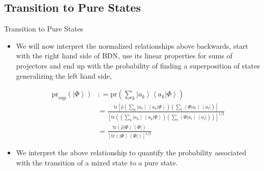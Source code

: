 \documentclass[9pt,handout]{beamer}
\newcommand{\pr}[0]{\text{pr}}
\newcommand{\tr}[0]{\text{tr}}
\begin{document}
\subsection{Transition to Pure States}
\begin{frame}{Transition to Pure States}
\begin{itemize}
\item We will now interpret the normalized relationships above backwards, start with the right hand side of BDN, use its linear properties for sums of projectors and end up with the probability of finding a superposition of states generalizing the left hand side,

\begin{align*}
\pr_{\text{sup}} \left( \left\lvert \Phi \right\rangle \right) & : = \pr \left( \sum_k \left\lvert a_k \right\rangle \left\langle a_k \right\rvert \left. \Phi \right\rangle \right) \\
& = \frac{\tr \left[ \widehat{\rho} \left( \sum_k \left\lvert a_k \right\rangle \left\langle a_k \right\rvert \left. \Phi \right\rangle \right) \left( \sum_l \left\langle \Phi \right\rvert \left. a_l \right\rangle \left\langle a_l \right\rvert \right) \right]}{\left[ \tr \left( \left( \sum_k \left\lvert a_k \right\rangle \left\langle a_k \right\rvert \left. \Phi \right\rangle \right) \left( \sum_l \left\langle \Phi \right\rvert \left. a_l \right\rangle \left\langle a_l \right\rvert \right) \right) \right]^{1/2}} \\
& = \frac{\tr \left( \widehat{\rho} \left\lvert \Phi \right\rangle \left\langle \Phi \right\rvert \right)}{\left[ \tr \left( \left\lvert \Phi \right\rangle \left\langle \Phi \right\rvert \right) \right]^{1/2}}
\end{align*}

\item We interpret the above relationship to quantify the probability associated with the transition of a mixed state to a pure state. 
\end{itemize}
\end{frame}
\end{document}
